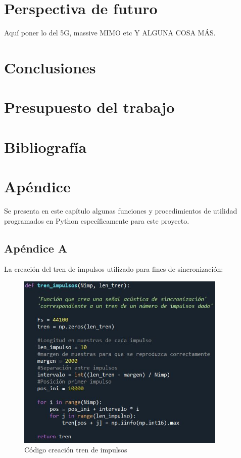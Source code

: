 \documentclass[a4paper,11pt]{book}
\begin{document}
\chapter{Perspectiva de futuro}
Aquí poner lo del 5G, massive MIMO etc Y ALGUNA COSA MÁS.
\chapter{Conclusiones}

\chapter{Presupuesto del trabajo}

\chapter{Bibliografía}



\chapter{Apéndice}
Se presenta en este capítulo algunas funciones y procedimientos de utilidad programados en Python específicamente para este proyecto.
\section{Apéndice A}
La creación del tren de impulsos utilizado para fines de sincronización:
\begin{figure}[hbtp]
\centering
\includegraphics[width = 10cm]{FIGURAS/creacion_impulsos_codigo.JPG}
\caption{Código creación tren de impulsos}
\end{figure}
\end{document}
